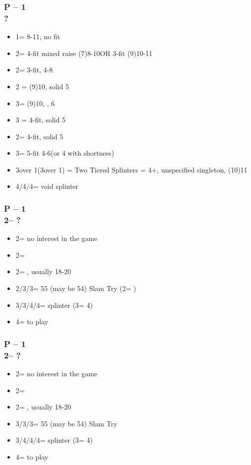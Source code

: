 \subsubsection*{P -- 1\major \\ ?}
\begin{itemize}
    \item 1\nt = 8-11, no fit
    \item 2\clubs = 4-fit mixed raise (7)8-10\dps OR 3-fit (9)10-11\dps
    \item 2\major = 3-fit, 4-8\dps
    \item 2 = (9)10, solid 5
    \item 3\clubs = (9)10, \inv, 6\clubs
    \item 3 = 4-fit, solid 5
    \item 2\nt = 4-fit, solid 5\clubs
    \item 3\major = 5-fit 4-6\dps (or 4 with shortness)
    \item 3\nt over 1\spades (3\spades over 1\hearts) = Two Tiered Splinters = 4+\major, unspecified singleton, (10)11\dps
    \item 4\clubs/4\diams/4\hearts = void splinter
\end{itemize}

\subsubsection*{P -- 1\hearts \\ 2\clubs -- ?}
\begin{itemize}
    \item 2\hearts = no interest in the game
    \item 2\diams = \inv
    \item 2\spades = \lsf, usually 18-20 \bal
    \item 2\nt/3\clubs/3\diams = 55 (may be 54) Slam Try (2\nt = \spades)
    \item 3\nt/3\spades/4\clubs/4\diams = splinter (3\nt = 4\diams)
    \item 4\hearts = to play
\end{itemize}

\subsubsection*{P -- 1\spades \\ 2\clubs -- ?}
\begin{itemize}
    \item 2\spades = no interest in the game
    \item 2\diams = \inv
    \item 2\nt = \lsf, usually 18-20 \bal
    \item 3\clubs/3\diams/3\hearts = 55 (may be 54) Slam Try
    \item 3\nt/4\clubs/4\diams/4\hearts = splinter (3\nt = 4\hearts)
    \item 4\spades = to play
\end{itemize}

